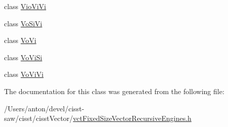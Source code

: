 \begin{DoxyCompactItemize}
\item 
class \hyperlink{classvct_fixed_size_vector_recursive_engines_3_010_01_4_1_1_vio_vi_vi}{Vio\+Vi\+Vi}
\item 
class \hyperlink{classvct_fixed_size_vector_recursive_engines_3_010_01_4_1_1_vo_si_vi}{Vo\+Si\+Vi}
\item 
class \hyperlink{classvct_fixed_size_vector_recursive_engines_3_010_01_4_1_1_vo_vi}{Vo\+Vi}
\item 
class \hyperlink{classvct_fixed_size_vector_recursive_engines_3_010_01_4_1_1_vo_vi_si}{Vo\+Vi\+Si}
\item 
class \hyperlink{classvct_fixed_size_vector_recursive_engines_3_010_01_4_1_1_vo_vi_vi}{Vo\+Vi\+Vi}
\end{DoxyCompactItemize}


The documentation for this class was generated from the following file\+:\begin{DoxyCompactItemize}
\item 
/\+Users/anton/devel/cisst-\/saw/cisst/cisst\+Vector/\hyperlink{vct_fixed_size_vector_recursive_engines_8h}{vct\+Fixed\+Size\+Vector\+Recursive\+Engines.\+h}\end{DoxyCompactItemize}
